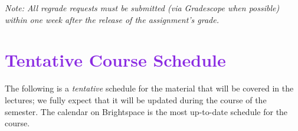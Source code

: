 \documentclass[letterpaper,11pt]{article}
\begin{document}
\emph{Note: All regrade requests must be submitted (via Gradescope
  when possible) within one week after the release of the assignment's
  grade.}






\section*{\textcolor{BlueViolet}{Tentative Course Schedule}}

The following is a \textit{tentative} schedule for the material that
will be covered in the lectures; we fully expect that it will be
updated during the course of the semester. The calendar on Brightspace
is the most up-to-date schedule for the course.
\end{document}

